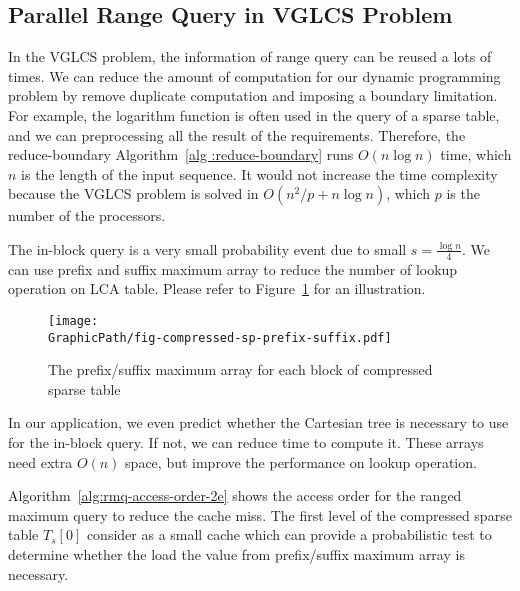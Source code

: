 \subsection{Parallel Range Query in VGLCS Problem}


In the VGLCS problem, the information of range query can be reused a
lots of times.  We can reduce the amount of computation for our dynamic
programming problem by remove duplicate computation and imposing a
boundary limitation.  For example, the logarithm function is often used
in the query of a sparse table, and we can preprocessing all the result
of the requirements.  Therefore, the reduce-boundary Algorithm~\ref{alg
:reduce-boundary} runs $O(n \log n)$ time, which $n$  is the length of
the input sequence.  It would not increase the time complexity because
the VGLCS problem is solved in  $O(n^2 / p + n \log n)$, which $p$ is
the number of the processors.

\iffalse
在 VGLCS 問題中，平行區間詢問的每個區間範圍都是已知的，每一個會重複使用好幾次，
由於已知詢問的區間資訊，我們可以藉由建表範圍縮小，
從算法 \ref{alg:reduce-boundary} 推導邊界來減少計算量。
\fi



The in-block query is a very small probability event due to small $s =
\frac{\log n}{4}$. We can use prefix and suffix maximum array to reduce
the number of lookup operation on LCA table.  Please refer to
Figure~\ref{fig:compressed-sp-opt} for an illustration.

\begin{figure}[!thb]
  \centering
  \texttt{[image: \\GraphicPath/fig-compressed-sp-prefix-suffix.pdf]}
  \caption{The prefix/suffix maximum array for each block of compressed sparse table}
  \label{fig:compressed-sp-opt}
\end{figure}

In our application, we even predict whether the Cartesian tree is
necessary to use for the in-block query. If not, we can reduce time to
compute it. These arrays need extra $O(n)$ space, but improve the
performance on lookup operation.  

Algorithm~\ref{alg:rmq-access-order-2e} shows the access order for the
ranged maximum query to reduce the cache miss.  The first level of the
compressed sparse table $T_s[0]$ consider as a small cache which can
provide a probabilistic test to determine whether the load the value
from prefix/suffix maximum array is necessary.



